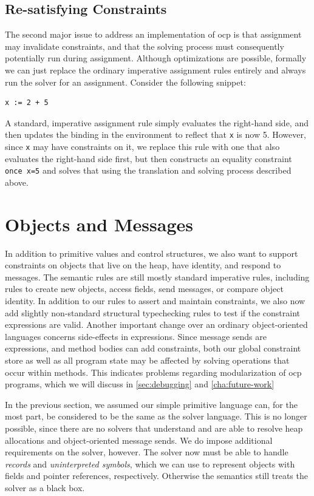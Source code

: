 \subsection{Re-satisfying Constraints}

The second major issue to address an implementation of \ac{ocp} is that
assignment may invalidate constraints, and that the solving process must
consequently potentially run during assignment. Although optimizations are
possible, formally we can just replace the ordinary imperative assignment rules
entirely and always run the solver for an assignment. Consider the following
snippet:
\begin{lstlisting}
x := 2 + 5
\end{lstlisting}
A standard, imperative assignment rule simply evaluates the right-hand side, and
then updates the binding in the environment to reflect that \verb!x! is now
5. However, since \verb!x! may have constraints on it, we replace this rule with
one that also evaluates the right-hand side first, but then constructs an
equality constraint \verb!once x=5! and solves that using the translation and
solving process described above.

\section{Objects and Messages}
\label{sec:constr-with-mess}
\renewcommand{\Scope}{\ensuremath{\mathbb{S}}\xspace}

In addition to primitive values and control structures, we also want to support
constraints on objects that live on the heap, have identity, and respond to
messages. The semantic rules are still mostly standard imperative rules,
including rules to create new objects, access fields, send messages, or compare
object identity. In addition to our rules to assert and maintain constraints, we
also now add slightly non-standard structural typechecking rules to test if the
constraint expressions are valid. Another important change over an ordinary
object-oriented languages concerns side-effects in expressions. Since message
sends are expressions, and method bodies can add constraints, both our global
constraint store as well as all program state may be affected by solving
operations that occur within methods. This indicates problems regarding
modularization of \ac{ocp} programs, which we will discuss in
\autoref{sec:debugging} and \autoref{cha:future-work}

In the previous section, we assumed our simple primitive language can, for the
most part, be considered to be the same as the solver language. This is no
longer possible, since there are no solvers that understand and are able to
resolve heap allocations and object-oriented message sends. We do impose
additional requirements on the solver, however. The solver now must be able to
handle \emph{records} and \emph{uninterpreted symbols}, which we can use to
represent objects with fields and pointer references, respectively. Otherwise
the semantics still treats the solver as a black box.

